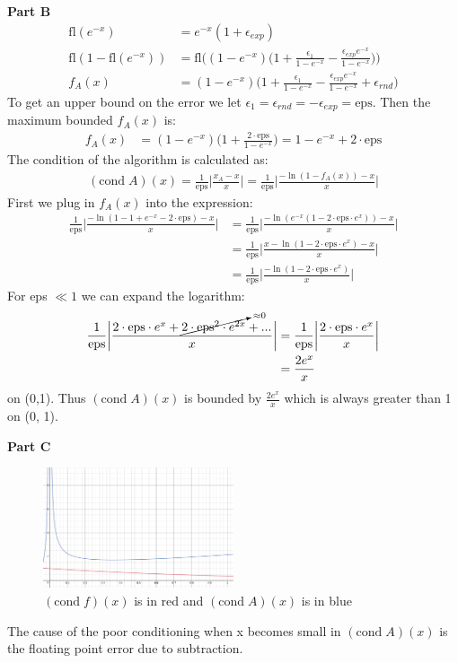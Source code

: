 \documentclass[12pt]{article}
\begin{document}
\noindent
\textbf{Part B}
\begin{align*}
\mathrm{fl}(e^{-x}) &= e^{-x} (1 + \epsilon_{exp})
\\
\mathrm{fl}(1 - \mathrm{fl}(e^{-x})) &= \mathrm{fl}\bigg((1 - e^{-x}) \bigg(1 + \frac{\epsilon_1}{1 - e^{-x}} - \frac{\epsilon_{exp} e^{-x}}{1 - e^{-x}}\bigg)\bigg)
\\
f_A(x) &= (1 - e^{-x}) \bigg(1 + \frac{\epsilon_1}{1 - e^{-x}} - \frac{\epsilon_{exp} e^{-x}}{1 - e^{-x}} + \epsilon_{rnd}\bigg)
\end{align*}
To get an upper bound on the error we let $\epsilon_1 = \epsilon_{rnd} = -\epsilon_{exp} = \mathrm{eps}$. Then the maximum bounded $f_A(x)$ is:
\begin{align*}
f_A(x) &= (1 - e^{-x}) \bigg(1 + \frac{2 \cdot \mathrm{eps}}{1 - e^{-x}}\bigg) = 1-e^{-x}+2\cdot \mathrm{eps}
\end{align*}
The condition of the algorithm is calculated as:
\begin{align*}
(\mathrm{cond} \; A)(x) = \frac{1}{\mathrm{eps}} \bigg| \frac{x_A - x}{x} \bigg| = \frac{1}{\mathrm{eps}} \bigg| \frac{-\ln(1 - f_A(x)) - x}{x} \bigg|
\end{align*}
First we plug in $f_A(x)$ into the expression:
\begin{align*}
\frac{1}{\mathrm{eps}} \bigg|\frac{-\ln(1-1+e^{-x}-2\cdot \mathrm{eps}) - x}{x} \bigg| &= \frac{1}{\mathrm{eps}} \bigg|\frac{-\ln(e^{-x}(1-2\cdot \mathrm{eps} \cdot e^x)) - x}{x} \bigg|
\\
&= \frac{1}{\mathrm{eps}} \bigg|\frac{x-\ln(1-2\cdot \mathrm{eps} \cdot e^x) - x}{x} \bigg|
\\
&= \frac{1}{\mathrm{eps}} \bigg|\frac{-\ln(1-2\cdot \mathrm{eps} \cdot e^x)}{x} \bigg|
\end{align*}
For eps $\ll 1$ we can expand the logarithm:
\begin{align*}
\frac{1}{\mathrm{eps}} \bigg|\frac{2\cdot \mathrm{eps} \cdot e^x + \cancelto{\approx 0}{2 \cdot \mathrm{eps}^2 \cdot e^{2x}} + ...}{x} \bigg| &= \frac{1}{\mathrm{eps}} \bigg|\frac{2\cdot \mathrm{eps} \cdot e^x}{x} \bigg|
\\
&= \frac{2 e^x}{x}
\end{align*}
on (0,1). Thus $(\mathrm{cond} \; A)(x)$ is bounded by $\frac{2 e^x}{x}$ which is always greater than 1 on (0, 1).

\noindent
\textbf{Part C}

\begin{figure}[!h]
\centering
\includegraphics[width=0.5\textwidth]{plot_condA.png}
\caption{$(\mathrm{cond} \; f)(x)$ is in red and $(\mathrm{cond} \; A)(x)$ is in blue}
\end{figure}
The cause of the poor conditioning when x becomes small in $(\mathrm{cond} \; A)(x)$ is the floating point error due to subtraction.
\end{document}
